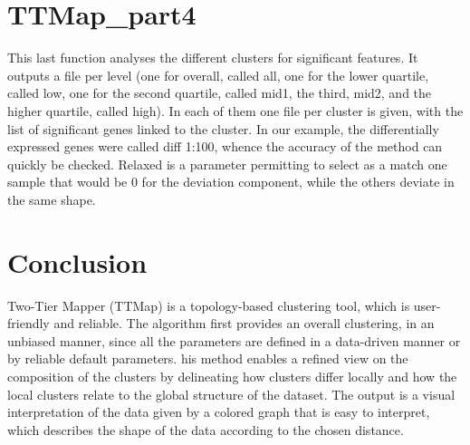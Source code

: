\documentclass[a4paper,12pt]{article}
\begin{document}
\section{TTMap\_part4}
This last function analyses the different clusters for significant features. It 
outputs a file per level 
(one for overall, called all, one for the lower quartile, 
called low, one for the second quartile, called mid1, the third, mid2, and 
the 
higher quartile, called high). In each of them one file per cluster is given, 
with the list of significant genes linked to the cluster. In our example, the 
differentially expressed genes were called diff 1:100, whence the accuracy 
of the method can quickly be checked. Relaxed is a parameter permitting 
to 
select as a match one sample that would be 0 
for the deviation component, 
while the others deviate in the same shape.
\begin{scriptsize}
\begin{Schunk}
\end{Schunk}
\end{scriptsize}
\section{Conclusion}
Two-Tier Mapper (TTMap) is a topology-based clustering tool, which is 
user-
friendly and reliable. The algorithm first provides an overall clustering, in 
an 
unbiased manner, since all the parameters are defined in a data-driven 
manner or by reliable default parameters. his method enables a refined 
view 
on the composition of the clusters by delineating
how clusters differ locally and how the local clusters relate to the global 
structure of the dataset. The output is a visual interpretation
of the data 
given by a colored graph that is easy to interpret, which describes the 
shape of the data according to the chosen distance. \\


\end{document}

